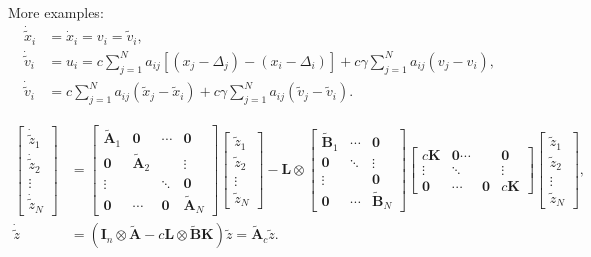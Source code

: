 \documentclass{article}
\begin{document}
\par More examples:
\begin{align*}
\dot{\tilde{x}}_i&= \dot{x}_i = v_i =  \tilde{v}_i,\\
\dot{\tilde{v}}_i&= u_i = c\sum_{j=1}^{N}a_{ij}[(x_j- \Delta_j)- (x_i- \Delta_i)] +  c \gamma \sum_{j=1}^{N}a_{ij}(v_j- v_i),\\
\dot{\tilde{v}}_i&=  c\sum_{j=1}^{N}a_{ij}(\tilde{x}_j- \tilde{x}_i) +  c \gamma \sum_{j=1}^{N}a_{ij}(\tilde{v}_j- \tilde{v}_i).
\end{align*}

\begin{align*}
\left[\begin{array}{c} \dot{\tilde{z}}_1\\ \dot{\tilde{z}}_2\\ \vdots \\ \dot{\tilde{z}}_N \end{array}\right]&= 
\left[ 
\begin{array}{cccc}
 \tilde{\mathbf{A}}_1 & \mathbf{0}& \cdots  & \mathbf{0} \\
 \mathbf{0}  & \tilde{\mathbf{A}}_2 & & \vdots \\
  \vdots & & \ddots & \mathbf{0}\\
\mathbf{0} & \cdots & \mathbf{0} & \tilde{\mathbf{A}}_N
\end{array}\right]
\left[\begin{array}{c}{\tilde{z}}_1\\ {\tilde{z}}_2\\ \vdots \\ {\tilde{z}}_N \end{array}\right]
 - \mathbf{L} \otimes
\left[
\begin{array}{cccc}
 \tilde{\mathbf{B}}_1 & \cdots  & \mathbf{0} \\
 \mathbf{0}  &\ddots  & \vdots \\
  \vdots &  & \mathbf{0}\\
\mathbf{0} & \cdots  & \tilde{\mathbf{B}}_N
\end{array}\right]
\left[
\begin{array}{cccc}
 c\mathbf{ K} & \mathbf{0}  \cdots&  & \mathbf{0} \\
  \vdots & \ddots & &\vdots \\
\mathbf{0} & \cdots &   \mathbf{0} & c \mathbf{K}
\end{array}\right]
\left[\begin{array}{c}{\tilde{z}}_1\\ {\tilde{z}}_2\\ \vdots \\ {\tilde{z}}_N \end{array}\right], \\[15pt]
\dot{\tilde{z}}&= (\mathbf{I}_n \otimes \tilde{\mathbf{A}} - c \mathbf{L} \otimes \tilde{\mathbf{B}} \mathbf{K})\tilde{z}= \tilde{\mathbf{A}}_c \tilde{z}.
\end{align*}
\end{document}
